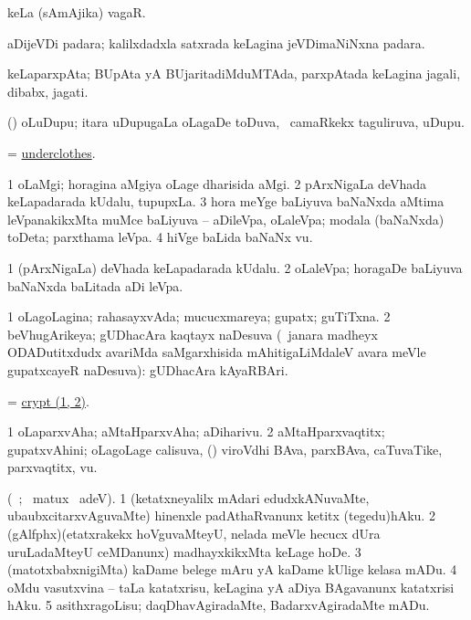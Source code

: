 \bentry
{} 
\gl{\nA}
\expl{}
\bmng
 keLa (sAmAjika) vagaR. 
\emng
\eentry

\bentry
{} 
\gl{\nA}
\expl{}
\bmng
 aDijeVDi padara; kalilxdadxla satxrada keLagina jeVDimaNiNxna padara. 
\emng
\eentry

\bentry
{} 
\gl{\nA}
\expl{}
\bmng
 keLaparxpAta; BUpAta yA BUjaritadiMduMTAda, parxpAtada keLagina jagali, dibabx, jagati. 
\emng
\eentry

\bentry
{} 
\gl{\nA}
\expl{}
\bmng
 (\bava) oLuDupu; itara uDupugaLa oLagaDe toDuva, \kanmu\ camaRkekx taguliruva, uDupu. 
\emng
\eentry

\bentry
{} 
\gl{\nA}
\expl{}
\bmng
= \hyperlink{underclothes}{underclothes}. 
\emng
\eentry

\bentry
{} 
\gl{\nA}
\expl{}
\bmng
\bnum
\num{1} oLaMgi; horagina aMgiya oLage dharisida aMgi. 
\num{2} pArxNigaLa deVhada keLapadarada kUdalu, tupupxLa. 
\num{3} hora meYge baLiyuva baNaNxda aMtima leVpanakikxMta muMce baLiyuva -- aDileVpa, oLaleVpa; modala (baNaNxda) toDeta; parxthama leVpa. 
\num{4} hiVge baLida baNaNx \mo vu. 
\enum
\emng
\eentry

\bentry
{} 
\gl{\nA}
\expl{}
\bmng
\bnum
\num{1} (pArxNigaLa) deVhada keLapadarada kUdalu. 
\num{2} oLaleVpa; horagaDe baLiyuva baNaNxda baLitada aDi leVpa. 
\enum
\emng
\eentry

\bentry
{} 
\gl{\gu}
\expl{}
\bmng
\bnum
\num{1} oLagoLagina; rahasayxvAda; mucucxmareya; gupatx; guTiTxna. 
\num{2} beVhugArikeya; gUDhacAra kaqtayx naDesuva (\kanmu\ janara madheyx ODADutitxdudx avariMda saMgarxhisida mAhitigaLiMdaleV avara meVle gupatxcayeR naDesuva):  gUDhacAra kAyaRBAri. 
\enum
\emng
\eentry

\bentry
{} 
\gl{\nA}
\expl{}
\bmng
 = \hyperref{kandict_c.pdf}{C}{crypt(1)}{crypt (1, 2)}. 
\emng
\eentry

\bentry
{} 
\gl{\nA}
\expl{}
\bmng
\bnum
\num{1} oLaparxvAha; aMtaHparxvAha; aDiharivu. 
\num{2} aMtaHparxvaqtitx; gupatxvAhini; oLagoLage calisuva, (\kanmu) viroVdhi BAva, parxBAva, caTuvaTike, parxvaqtitx, \mo vu. 
\enum
\emng
\eentry

\bentry
{} 
\gl{\sakirx}
\expl{}
\bmng
 (\vakaq\ ; \BU\ matux \BUkaq\ adeV). 
\bnum
\num{1} (ketatxneyalilx mAdari edudxkANuvaMte, ubaubxcitarxvAguvaMte) hinenxle padAthaRvanunx ketitx (tegedu)hAku. 
\num{2} (gAlfphx)(etatxrakekx hoVguvaMteyU, nelada meVle hecucx dUra uruLadaMteyU ceMDanunx) madhayxkikxMta keLage hoDe. 
\num{3} (matotxbabxnigiMta) kaDame belege mAru yA kaDame kUlige kelasa mADu. 
\num{4} oMdu vasutxvina -- taLa katatxrisu, keLagina yA aDiya BAgavanunx katatxrisi hAku. 
\num{5} asithxragoLisu; daqDhavAgiradaMte, BadarxvAgiradaMte mADu. 
\enum
\emng
\eentry

